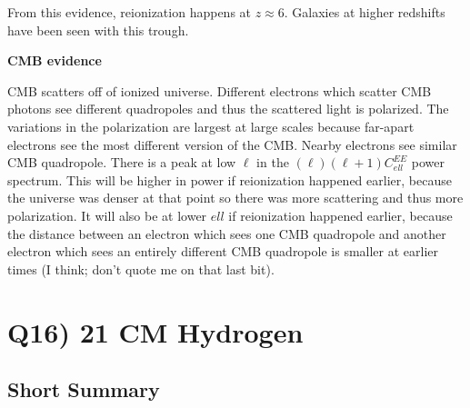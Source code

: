 \documentclass[\main/main.tex]{subfiles}
\begin{document}
    From this evidence, reionization happens at $z\approx6$. Galaxies at higher redshifts have been seen with this trough.
    \par
    \textbf{CMB evidence}
    \par
    CMB scatters off of ionized universe. Different electrons which scatter CMB photons see different quadropoles and thus the scattered light is polarized. The variations in the polarization are largest at large scales because far-apart electrons see the most different version of the CMB. Nearby electrons see similar CMB quadropole. There is a peak at low $\ell$ in the $(\ell)(\ell+1)C_{ell}^{EE}$ power spectrum. This will be higher in power if reionization happened earlier, because the universe was denser at that point so there was more scattering and thus more polarization. It will also be at lower ${ell}$ if reionization happened earlier, because the distance between an electron which sees one CMB quadropole and another electron which sees an entirely different CMB quadropole is smaller at earlier times (I think; don't quote me on that last bit).



\section{Q16) 21 CM Hydrogen} %
\label{sec:q16_21_cm_hydrogen}

	\subsection{Short Summary} %
	\label{sub:subsection_name}
	


	
\end{document}
